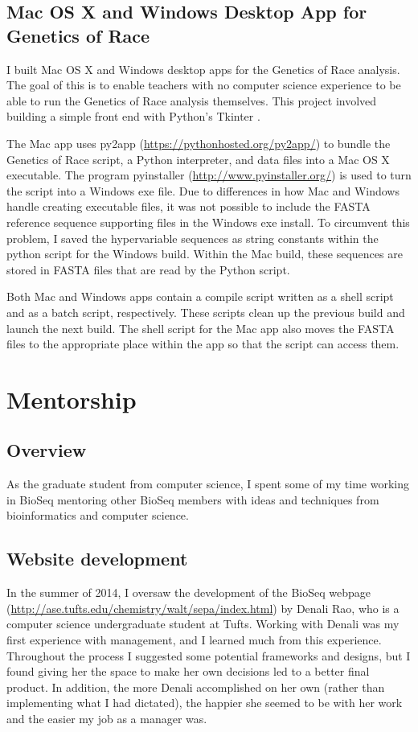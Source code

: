 \documentclass{report}
\begin{document}
\section{Mac OS X and Windows Desktop App for Genetics of Race}

I built Mac OS X and Windows desktop apps for the Genetics of Race analysis. The goal of this is to enable teachers with no computer science experience to be able to run the Genetics of Race analysis themselves. This project involved building a simple front end with Python's Tkinter \cite{shipman2005tkinter}. 

The Mac app uses py2app (\url{https://pythonhosted.org/py2app/}) to bundle the Genetics of Race script, a Python interpreter, and data files into a Mac OS X executable. The program pyinstaller (\url{http://www.pyinstaller.org/}) is used to turn the script into a Windows exe file. Due to differences in how Mac and Windows handle creating executable files, it was not possible to include the FASTA reference sequence supporting files in the Windows exe install. To circumvent this problem, I saved the hypervariable sequences as string constants within the python script for the Windows build. Within the Mac build, these sequences are stored in FASTA files that are read by the Python script. 

Both Mac and Windows apps contain a compile script written as a shell script and as a batch script, respectively. These scripts clean up the previous build and launch the next build. The shell script for the Mac app also moves the FASTA files to the appropriate place within the app so that the script can access them.


\chapter{Mentorship}
\section{Overview}
As the graduate student from computer science, I spent some of my time working in BioSeq mentoring other BioSeq members with ideas and techniques from  bioinformatics and computer science. 

\section{Website development}
In the summer of 2014, I oversaw the development of the BioSeq webpage (\url{http://ase.tufts.edu/chemistry/walt/sepa/index.html}) by Denali Rao, who is a computer science undergraduate student at Tufts. Working with Denali was my first experience with management, and I learned much from this experience. Throughout the process I suggested some potential frameworks and designs, but I found giving her the space to make her own decisions led to a better final product. In addition, the more Denali accomplished on her own (rather than implementing what I had dictated), the happier she seemed to be with her work and the easier my job as a manager was.
\end{document}
